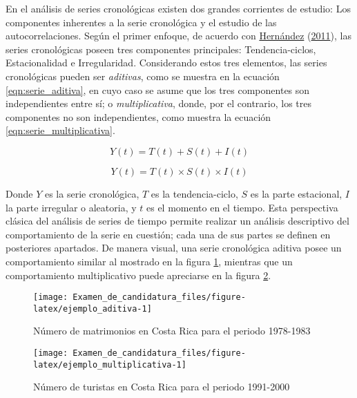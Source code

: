 \documentclass[
]{article}
\begin{document}
En el análisis de series cronológicas existen dos grandes corrientes de
estudio: Los componentes inherentes a la serie cronológica y el estudio
de las autocorrelaciones. Según el primer enfoque, de acuerdo con
\protect\hyperlink{ref-oscarh-1}{Hernández}
(\protect\hyperlink{ref-oscarh-1}{2011}), las series cronológicas poseen
tres componentes principales: Tendencia-ciclos, Estacionalidad e
Irregularidad. Considerando estos tres elementos, las series
cronológicas pueden ser \emph{aditivas}, como se muestra en la ecuación
\ref{eqn:serie_aditiva}, en cuyo caso se asume que los tres componentes
son independientes entre sí; o \emph{multiplicativa}, donde, por el
contrario, los tres componentes no son independientes, como muestra la
ecuación \ref{eqn:serie_multiplicativa}.

\begin{equation}
\label{eqn:serie_aditiva}
Y(t)=T(t)+S(t)+I(t)
\end{equation}

\begin{equation}
\label{eqn:serie_multiplicativa}
Y(t)=T(t)\times S(t)\times I(t)
\end{equation}

Donde \(Y\) es la serie cronológica, \(T\) es la tendencia-ciclo, \(S\)
es la parte estacional, \(I\) la parte irregular o aleatoria, y \(t\) es
el momento en el tiempo. Esta perspectiva clásica del análisis de series
de tiempo permite realizar un análisis descriptivo del comportamiento de
la serie en cuestión; cada una de sus partes se definen en posteriores
apartados. De manera visual, una serie cronológica aditiva posee un
comportamiento similar al mostrado en la figura
\ref{fig:ejemplo_aditiva}, mientras que un comportamiento multiplicativo
puede apreciarse en la figura \ref{fig:ejemplo_multiplicativa}.

\begin{figure}[H]
\texttt{[image: Examen\_de\_candidatura\_files/figure-latex/ejemplo\_aditiva-1]} \caption{Número de matrimonios en Costa Rica para el periodo 1978-1983}\label{fig:ejemplo_aditiva}
\end{figure}

\begin{figure}[H]
\texttt{[image: Examen\_de\_candidatura\_files/figure-latex/ejemplo\_multiplicativa-1]} \caption{Número de turistas en Costa Rica para el periodo 1991-2000}\label{fig:ejemplo_multiplicativa}
\end{figure}
\end{document}
